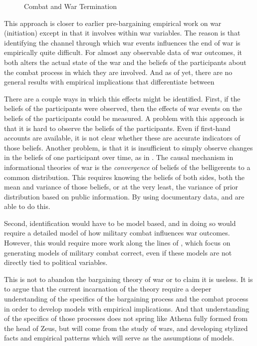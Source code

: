 \begin{figure}[htpb]
  \centering
  
  \caption{Combat and War Termination}
  \label{bonds:fig:combat-causal-diagram}
\end{figure}

This approach is closer to earlier pre-bargaining empirical work on war (initiation) except in that it involves within war variables. %
The reason is that identifying the channel through which war events influences the end of war is empirically quite difficult. %
For almost any observable data of war outcomes, it both alters the actual state of the war and the beliefs of the participants about the combat process in which they are involved. %
And as of yet, there are no general results with empirical implications that differentiate between

There are a couple ways in which this effects might be identified. %
First, if the beliefs of the participants were observed, then the effects of war events on the beliefs of the participants could be measured. %
A problem with this approach is that it is hard to observe the beliefs of the participants.
Even if first-hand accounts are available, it is not clear whether these are accurate indicators of those beliefs. %
Another problem, is that it is insufficient to simply observe changes in the beliefs of one participant over time, as in \textcite{Reiter2009}. %
The causal mechanism in informational theories of war is the \textit{convergence} of beliefs of the belligerents to a common distribution. %
This requires knowing the beliefs of both sides, both the mean and variance of those beliefs, or at the very least, the variance of prior distribution based on public information. %
By using documentary data, \textcite{Goemans2000} and \textcite{Reiter2009} are able to do this.

Second, identification would have to be model based, and in doing so would require a detailed model of how military combat influences war outcomes.
However, this would require more work along the lines of \textcite{Biddle2004}, which focus on generating models of military combat correct, even if these models are not directly tied to political variables.

This is not to abandon the bargaining theory of war or to claim it is useless.
It is to argue that the current incarnation of the theory require a deeper understanding of the specifics of the bargaining process and the combat process in order to develop models with empirical implications.
And that understanding of the specifics of those processes does not spring like Athena fully formed from the head of Zeus, but will come from the study of wars, and developing stylized facts and empirical patterns which will serve as the assumptions of models.

